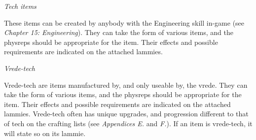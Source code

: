 \textit{Tech items}

These items can be created by anybody with the Engineering skill in-game (see \textit{Chapter 15: Engineering}). They can take the form of various items, and the physreps should be appropriate for the item. Their effects and possible requirements are indicated on the attached lammies.

\textit{Vrede-tech}

Vrede-tech are items manufactured by, and only useable by, the vrede. They can take the form of various items, and the physreps should be appropriate for the item. Their effects and possible requirements are indicated on the attached lammies. Vrede-tech often has unique upgrades, and progression different to that of tech on the crafting lists (see \textit{Appendices E.} and \textit{F.}). If an item is vrede-tech, it will state so on its lammie.
